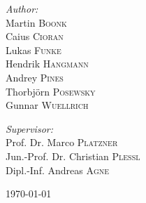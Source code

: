 \begin{titlepage}
\begin{center}
\begin{minipage}[t]{0.495\textwidth}
\begin{flushleft} \large
\emph{Author:}\\
Martin \textsc{Boonk}\\
Caius \textsc{Cioran}\\
Lukas \textsc{Funke}\\
Hendrik \textsc{Hangmann}\\
Andrey \textsc{Pines}\\
Thorbj\"orn \textsc{Posewsky}\\
Gunnar \textsc{Wuellrich}
\end{flushleft}
\end{minipage}
\hfill
\begin{minipage}[t]{0.495\textwidth}
\begin{flushright} \large
\emph{Supervisor:}\\
Prof. Dr. Marco \textsc{Platzner}\\
Jun.-Prof. Dr. Christian \textsc{Plessl}\\
Dipl.-Inf. Andreas \textsc{Agne}
\end{flushright}
\end{minipage}

\vfill

{\large \today}

\end{center}

\end{titlepage}